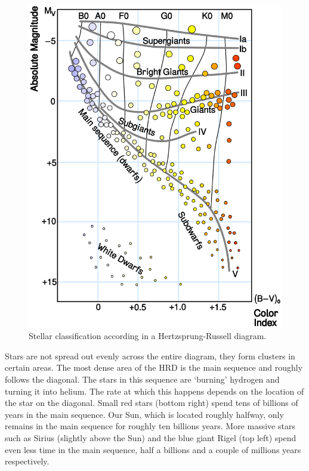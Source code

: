 \documentclass[12pt,a4paper]{article}
\numberwithin{equation}{section}
\numberwithin{figure}{section}
\numberwithin{table}{section}
\begin{document}
\begin{figure}\begin{center}
\includegraphics[scale=0.4]{H-R_diagram.eps}
\caption{Stellar classification according in a Hertzsprung-Russell diagram.\protect\footnotemark}\label{fig:HRD_1}
\end{center}\end{figure}

Stars are not spread out evenly across the entire diagram, they form clusters in certain areas. The most dense area of the HRD is the main sequence and roughly follows the diagonal. The stars in this sequence are `burning' hydrogen and turning it into helium. The rate at which this happens depends on the location of the star on the diagonal. Small red stars (bottom right) spend tens of billions of years in the main sequence. Our Sun, which is located roughly halfway, only remains in the main sequence for roughly ten billions years. More massive stars such as Sirius (slightly above the Sun) and the blue giant Rigel (top left) spend even less time in the main sequence, half a billions and a couple of millions years respectively.
\end{document}
